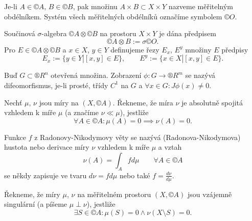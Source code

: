 \documentclass[12pt]{article}					%
\begin{document}

\begin{definice}
	Je-li $A \in ©A$, $B \in ©B$, pak množinu $A \times B \subset X \times Y$ nazveme měřitelným obdélníkem. Systém všech měřitelných obdélníků označíme symbolem $©O$.

	Součinová $\sigma$-algebra $©A \otimes ©B$ na prostoru $X \times Y$ je dána předpisem
	$$ ©A \otimes B := \sigma ©O. $$
	Pro $E \in ©A \otimes ©B$ a $x \in X$, $y \in Y$ definujeme řezy $E_x$, $E^y$ množiny $E$ předpisy
	$$ E_x := \{y \in Y | [x, y] \in E\}, \qquad E^y := \{x \in X | [x, y] \in E\}. $$
\end{definice}



\begin{definice}[$C^1$-difeomorfismus]
	Buď $G \subset ®R^n$ otevřená množina. Zobrazení $\phi: G \rightarrow ®R^m$ se nazývá difeomorfismus, je-li prosté, třídy $C^1$ na $G$ a $\forall x \in G: J \phi(x) ≠ 0$.
\end{definice}



\begin{definice}
	Nechť $\mu$, $\nu$ jsou míry na $(X, ©A)$. Řekneme, že míra $\nu$ je absolutně spojitá vzhledem k míře $\mu$ (a značíme $\nu \ll \mu$), jestliže
	$$ \forall A \in ©A: \mu(A) = 0 \implies \nu(A) = 0. $$
\end{definice}

\begin{definice}
	Funkce $f$ z Radonovy-Nikodymovy věty se nazývá (Radonova-Nikodymova) hustota nebo derivace míry $\nu$ vzhledem k míře $\mu$ a vztah
	$$ \nu(A) = \int_A f d\mu \qquad \forall A \in ©A $$
	se někdy zapisuje ve tvaru $d\nu = f d\mu$ nebo také $f = \frac{d\nu}{d\mu}$.
\end{definice}


\begin{definice}
	Řekneme, že míry $\mu$, $\nu$ na měřitelném prostoru $(X, ©A)$ jsou vzájemně singulární (a píšeme $\mu \perp \nu$), jestliže
	$$ \exists S \in ©A: \mu(S) = 0 \land \nu(X \setminus S) = 0. $$
\end{definice}
\end{document}
